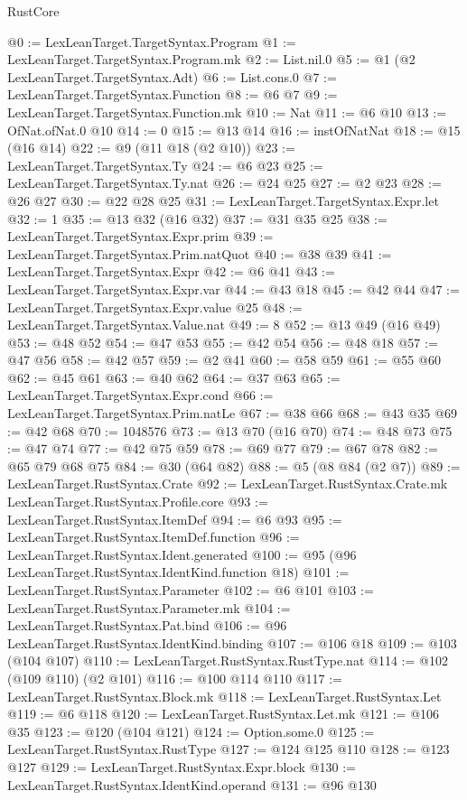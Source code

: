\begin{lexlean}{RustCore}
\begin{coremodule}
@0 := LexLeanTarget.TargetSyntax.Program
@1 := LexLeanTarget.TargetSyntax.Program.mk
@2 := List.nil.{0}
@5 := @1 (@2 LexLeanTarget.TargetSyntax.Adt)
@6 := List.cons.{0}
@7 := LexLeanTarget.TargetSyntax.Function
@8 := @6 @7
@9 := LexLeanTarget.TargetSyntax.Function.mk
@10 := Nat
@11 := @6 @10
@13 := OfNat.ofNat.{0} @10
@14 := 0
@15 := @13 @14
@16 := instOfNatNat
@18 := @15 (@16 @14)
@22 := @9 (@11 @18 (@2 @10))
@23 := LexLeanTarget.TargetSyntax.Ty
@24 := @6 @23
@25 := LexLeanTarget.TargetSyntax.Ty.nat
@26 := @24 @25
@27 := @2 @23
@28 := @26 @27
@30 := @22 @28 @25
@31 := LexLeanTarget.TargetSyntax.Expr.let
@32 := 1
@35 := @13 @32 (@16 @32)
@37 := @31 @35 @25
@38 := LexLeanTarget.TargetSyntax.Expr.prim
@39 := LexLeanTarget.TargetSyntax.Prim.natQuot
@40 := @38 @39
@41 := LexLeanTarget.TargetSyntax.Expr
@42 := @6 @41
@43 := LexLeanTarget.TargetSyntax.Expr.var
@44 := @43 @18
@45 := @42 @44
@47 := LexLeanTarget.TargetSyntax.Expr.value @25
@48 := LexLeanTarget.TargetSyntax.Value.nat
@49 := 8
@52 := @13 @49 (@16 @49)
@53 := @48 @52
@54 := @47 @53
@55 := @42 @54
@56 := @48 @18
@57 := @47 @56
@58 := @42 @57
@59 := @2 @41
@60 := @58 @59
@61 := @55 @60
@62 := @45 @61
@63 := @40 @62
@64 := @37 @63
@65 := LexLeanTarget.TargetSyntax.Expr.cond
@66 := LexLeanTarget.TargetSyntax.Prim.natLe
@67 := @38 @66
@68 := @43 @35
@69 := @42 @68
@70 := 1048576
@73 := @13 @70 (@16 @70)
@74 := @48 @73
@75 := @47 @74
@77 := @42 @75 @59
@78 := @69 @77
@79 := @67 @78
@82 := @65 @79 @68 @75
@84 := @30 (@64 @82)
@88 := @5 (@8 @84 (@2 @7))
@89 := LexLeanTarget.RustSyntax.Crate
@92 := LexLeanTarget.RustSyntax.Crate.mk LexLeanTarget.RustSyntax.Profile.core
@93 := LexLeanTarget.RustSyntax.ItemDef
@94 := @6 @93
@95 := LexLeanTarget.RustSyntax.ItemDef.function
@96 := LexLeanTarget.RustSyntax.Ident.generated
@100 := @95 (@96 LexLeanTarget.RustSyntax.IdentKind.function @18)
@101 := LexLeanTarget.RustSyntax.Parameter
@102 := @6 @101
@103 := LexLeanTarget.RustSyntax.Parameter.mk
@104 := LexLeanTarget.RustSyntax.Pat.bind
@106 := @96 LexLeanTarget.RustSyntax.IdentKind.binding
@107 := @106 @18
@109 := @103 (@104 @107)
@110 := LexLeanTarget.RustSyntax.RustType.nat
@114 := @102 (@109 @110) (@2 @101)
@116 := @100 @114 @110
@117 := LexLeanTarget.RustSyntax.Block.mk
@118 := LexLeanTarget.RustSyntax.Let
@119 := @6 @118
@120 := LexLeanTarget.RustSyntax.Let.mk
@121 := @106 @35
@123 := @120 (@104 @121)
@124 := Option.some.{0}
@125 := LexLeanTarget.RustSyntax.RustType
@127 := @124 @125 @110
@128 := @123 @127
@129 := LexLeanTarget.RustSyntax.Expr.block
@130 := LexLeanTarget.RustSyntax.IdentKind.operand
@131 := @96 @130

\end{coremodule}
\end{lexlean}
